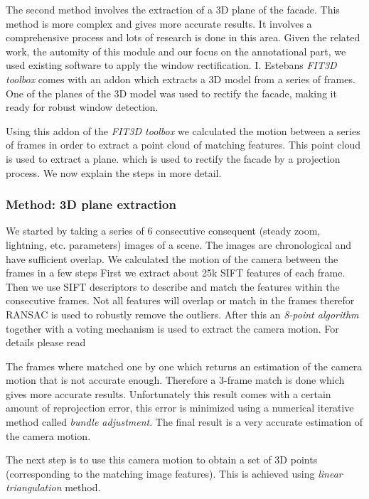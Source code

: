 The second method involves the extraction of a 3D plane of the facade. This 
method is more complex and gives more accurate results. It involves a
comprehensive process and lots of research is done in this area. 
Given the related work, the automity of this module and our focus on the annotational part,
we used existing software to apply the window rectification.
I. Estebans \emph{FIT3D toolbox} comes with an addon which extracts a 3D model from a
series of frames.  One of the planes of the 3D model was used to rectify the
facade, making it ready for robust window detection. 

Using this addon of the \emph{FIT3D toolbox} we calculated the motion between a
series of frames in order to extract a point cloud of matching features. This
point cloud is used to extract a plane.  which is used to rectify the facade by
a projection process.  We now explain the steps in more detail.

\subsubsection{Method: 3D plane extraction}
We started by taking a series of 6 consecutive consequent (steady zoom, lightning, etc. parameters) images of a scene.
The images are chronological and have sufficient overlap. 
We calculated the motion of the camera between the frames in a few steps
First we extract about 25k SIFT features of each frame.  Then we use
SIFT descriptors to describe and match the features within the consecutive
frames.  Not all features will overlap or match in the frames therefor RANSAC is used to
robustly remove the outliers.  After this an \emph{8-point algorithm} together with a
voting mechanism is used to extract the camera motion. For details please read

The frames where matched one by one which returns an estimation of the camera
motion that is not accurate enough.  Therefore a 3-frame match is done which
gives more accurate results.  Unfortunately this result comes with a certain
amount of reprojection error, this error is minimized using a numerical
iterative method called \emph{bundle adjustment}.  The final result is a very
accurate estimation of the camera motion.

The next step is to use this camera motion to obtain a set of 3D points
(corresponding to the matching image features).  This is achieved using \emph{linear triangulation}
method. 

